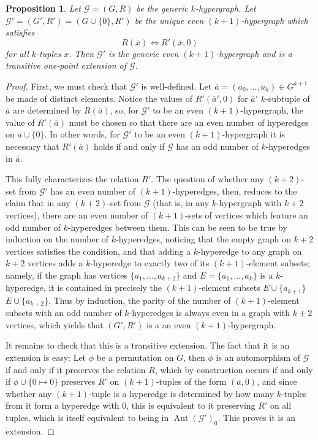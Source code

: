 \documentclass{amsart}
\newtheorem{proposition}[theorem]{Proposition}
\def\graph{\mathcal{G}}
\newcommand{\set}[1]{\{#1 \}}
\DeclareMathOperator{\Aut}{Aut}
\begin{document}
\begin{proposition}\label{Extension of Rado Graph}
    Let $\graph = (G, R)$ be the generic $k$-hypergraph. Let $\graph' = (G', R') = (G \cup \set{0}, R')$ be the unique \emph{even} $(k+1)$-hypergraph which satisfies $$ R(\overline{x}) \Longleftrightarrow R'(\overline{x},0)$$ for all $k$-tuples $\overline{x}$. Then $\graph'$ is the generic even $(k+1)$-hypergraph and is a transitive one-point extension of $\graph$.
\end{proposition}
\begin{proof}
    First, we must check that $\graph'$ is well-defined. Let $\overline{a} = (a_0, \dots, a_k) \in G^{k+1}$ be made of distinct elements. Notice the values of $R'(\overline{a}',0)$ for $\overline{a}'$ $k$-subtuple of $\overline{a}$ are determined by $R(\overline{a})$, so, for $\graph'$ to be an even $(k+1)$-hypergraph, the value of $R'(\overline{a})$ must be chosen so that there are an even number of hyperedges on $\overline{a} \cup\set{0}$. In other words, for $\graph'$ to be an even $(k+1)$-hypergraph it is necessary that $R'(\overline{a})$ holds if and only if $\graph$ has an odd number of $k$-hyperedges in $\overline{a}$.

    This fully characterizes the relation $R'$. The question of whether any $(k+2)$-set from $\graph '$ has an even number of $(k+1)$-hyperedges, then, reduces to the claim that in any $(k+2)$-set from $\graph$ (that is, in any $k$-hypergraph with $k+2$ vertices), there are an even number of $(k+1)$-sets of vertices which feature an odd number of $k$-hyperedges between them. This can be seen to be true by induction on the number of $k$-hyperedges, noticing that the empty graph on $k+2$ vertices satisfies the condition, and that adding a $k$-hyperedge to any graph on $k+2$ vertices adds a $k$-hyperedge to exactly two of its $(k+1)$-element subsets; namely, if the graph has vertices $\set{a_1, \dots, a_{k+2}}$ and $E = \set{a_1, \dots, a_{k}}$ is a $k$-hyperedge, it is contained in precisely the $(k+1)$-element subsets $E\cup\set{a_{k+1}}$ $E\cup\set{a_{k+2}}$. Thus by induction, the parity of the number of $(k+1)$-element subsets with an odd number of $k$-hyperedges is always even in a graph with $k+2$ vertices, which yields that $(G', R')$ is a an even $(k+1)$-hypergraph.

    It remains to check that this is a transitive extension. The fact that it is an extension is easy: Let $\phi$ be a permutation on $G$, then $\phi$ is an automorphism of $\graph$ if and only if it preserves the relation $R$, which by construction occurs if and only if $\phi\cup\{0\mapsto 0\}$ preserves $R'$ on $(k+1)$-tuples of the form $(\overline{a}, 0)$, and since whether any $(k+1)$-tuple is a hyperedge is determined by how many $k$-tuples from it form a hyperedge with 0, this is equivalent to it preserving $R'$ on all tuples, which is itself equivalent to being in $\Aut(\graph')_0$. This proves it is an extension.


\end{proof}
\end{document}
